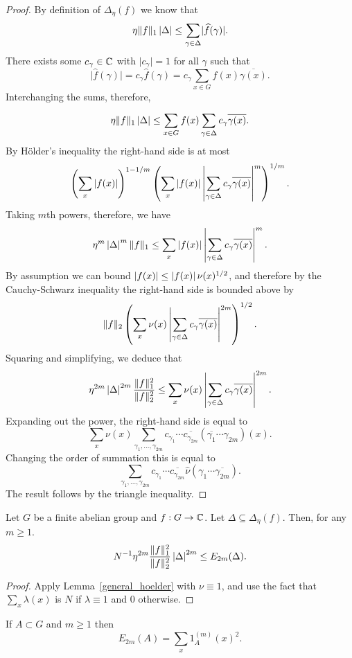 \begin{proof}
By definition of $\Delta_\eta(f)$ we know that
\[\eta\lVert f\rVert_1\left\lvert \Delta\right\rvert\leq \sum_{\gamma\in\Delta} \lvert \widehat{f}(\gamma)\rvert.\]
There exists some $c_\gamma\in\mathbb{C}$ with $\lvert c_\gamma\rvert=1$ for all $\gamma$ such that
\[\lvert \widehat{f}(\gamma)\rvert=c_\gamma\widehat{f}(\gamma)=c_\gamma \sum_{x\in G}f(x)\overline{\gamma(x)}.\]
Interchanging the sums, therefore,

\[\eta\lVert f\rVert_1\left\lvert \Delta\right\rvert\leq \sum_{x\in G}f(x)\sum_{\gamma\in\Delta} c_\gamma \overline{\gamma(x)}.\]
By H\"{o}lder's inequality the right-hand side is at most
\[\left( \sum_x \left\lvert f(x)\right\rvert\right)^{1-1/m}\left( \sum_x \left\lvert f(x)\right\rvert\left\lvert \sum_{\gamma\in\Delta}c_\gamma\overline{\gamma(x)}\right\rvert^m\right)^{1/m}.\]
Taking $m$th powers, therefore, we have
\[\eta^m\left\lvert \Delta\right\rvert^m\lVert f\rVert_1\leq \sum_{x}\left\lvert f(x)\right\rvert\left\lvert \sum_{\gamma\in\Delta}c_\gamma\overline{\gamma(x)}\right\rvert^m.\]
By assumption we can bound $\left\lvert f(x)\right\rvert\leq \left\lvert f(x)\right\rvert\nu(x)^{1/2}$, and therefore by the Cauchy-Schwarz inequality the right-hand side is bounded above by
\[\lVert f\rVert_2\left( \sum_x \nu(x)\left\lvert \sum_{\gamma\in\Delta}c_\gamma\overline{\gamma(x)}\right\rvert^{2m}\right)^{1/2}.\]
Squaring and simplifying, we deduce that
\[\eta^{2m}\left\lvert \Delta\right\rvert^{2m}\frac{\lVert f\rVert_1^2}{\lVert f\rVert_2^2}\leq \sum_x \nu(x)\left\lvert \sum_{\gamma\in\Delta}c_\gamma\overline{\gamma(x)}\right\rvert^{2m}.\]
Expanding out the power, the right-hand side is equal to
\[\sum_x \nu(x)\sum_{\gamma_1,\ldots,\gamma_{2m}}c_{\gamma_1}\cdots \overline{c_{\gamma_{2m}}} (\overline{\gamma_1}\cdots \gamma_{2m})(x).\]
Changing the order of summation this is equal to
\[\sum_{\gamma_1,\ldots,\gamma_{2m}}c_{\gamma_1}\cdots \overline{c_{\gamma_{2m}}}
\widehat{\nu}(\gamma_1\cdots \overline{\gamma_{2m}}).\]
The result follows by the triangle inequality.
\end{proof}


\begin{lemma}
\label{spec_hoelder}
Let $G$ be a finite abelian group and $f:G\to\mathbb{C}$. Let $\Delta\subseteq \Delta_\eta(f)$. Then, for any $m\geq 1$.
\[N^{-1}\eta^{2m}\frac{\lVert f\rVert_1^2}{\lVert f\rVert_2^2}\left\lvert \Delta\right\rvert^{2m}\leq E_{2m}(\Delta).\]
\end{lemma}

\begin{proof}
Apply Lemma~\ref{general_hoelder} with $\nu\equiv 1$, and use the fact that $\sum_x \lambda(x)$ is $N$ if $\lambda\equiv 1$ and $0$ otherwise.
\end{proof}


\begin{lemma}
\label{energy_alt}
\leanok
If $A\subset G$ and $m\geq 1$ then
\[E_{2m}(A) = \sum_x 1_A^{(m)}(x)^2.\]
\end{lemma}

